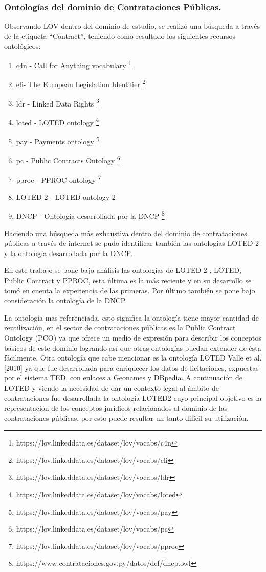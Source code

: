 \subsubsection{Ontologías del dominio de Contrataciones Públicas.}

Observando LOV dentro del dominio de estudio, se realizó una búsqueda a través de la etiqueta “Contract”, teniendo como resultado los siguientes recursos ontológicos:

\begin{enumerate}
    \item c4n - Call for Anything vocabulary \footnote{https://lov.linkeddata.es/dataset/lov/vocabs/c4n}
    \item eli- The European Legislation Identifier \footnote{https://lov.linkeddata.es/dataset/lov/vocabs/eli}
    \item ldr - Linked Data Rights \footnote{https://lov.linkeddata.es/dataset/lov/vocabs/ldr}
    \item loted - LOTED ontology \footnote{https://lov.linkeddata.es/dataset/lov/vocabs/loted}
    \item pay - Payments ontology \footnote{https://lov.linkeddata.es/dataset/lov/vocabs/pay}
    \item  pc - Public Contracts Ontology \footnote{https://lov.linkeddata.es/dataset/lov/vocabs/pc}
    \item pproc - PPROC ontology \footnote{https://lov.linkeddata.es/dataset/lov/vocabs/pproc} 
    \item LOTED 2 - LOTED ontology 2 \cite{distinto2014loted2}
    \item DNCP - Ontologia desarrollada por la DNCP \footnote{https://www.contrataciones.gov.py/datos/def/dncp.owl}
\end{enumerate}


Haciendo una búsqueda más exhaustiva dentro del dominio de contrataciones públicas a través de internet se pudo identificar también las ontologías LOTED 2 y la ontología desarrollada por la DNCP.

En este trabajo se pone bajo análisis las ontologías de LOTED 2 , LOTED, Public Contract y PPROC, esta última es la más reciente y en su desarrollo se tomó en cuenta la experiencia de las primeras. Por último también se pone bajo consideración la ontología de la DNCP.

La ontología mas referenciada, esto significa la ontología tiene mayor cantidad de reutilización, en el sector de contrataciones públicas es la Public Contract Ontology (PCO)\cite{klimek2012lod2}  ya que ofrece un medio de expresión para describir los conceptos básicos de este dominio logrando así que otras ontologías puedan extender de ésta fácilmente. Otra ontología que cabe mencionar es la ontología LOTED Valle et al. [2010] ya que fue desarrollada para enriquecer los datos de licitaciones, expuestas por el sistema TED, con enlaces a Geonames y DBpedia. A continuación de LOTED y viendo la necesidad de dar un contexto legal al ámbito de contrataciones fue desarrollada la ontología LOTED2\cite{distinto2014loted2} cuyo principal objetivo es la representación de los conceptos jurídicos relacionados al dominio de las contrataciones públicas, por esto puede resultar un tanto difícil su utilización.

